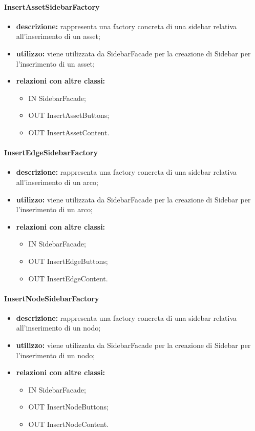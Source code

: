 \paragraph{InsertAssetSidebarFactory}
\begin{itemize}
	\item \textbf{descrizione:} rappresenta una factory concreta di una sidebar relativa all'inserimento di un asset;
	\item \textbf{utilizzo:} viene utilizzata da SidebarFacade per la creazione di Sidebar per l'inserimento di un asset;
	\item \textbf{relazioni con altre classi:} 
	\begin{itemize}
		\item IN SidebarFacade;
		\item OUT InsertAssetButtons;
		\item OUT InsertAssetContent.
	\end{itemize}
\end{itemize}
\paragraph{InsertEdgeSidebarFactory}
\begin{itemize}
	\item \textbf{descrizione:} rappresenta una factory concreta di una sidebar relativa all'inserimento di un arco;
	\item \textbf{utilizzo:} viene utilizzata da SidebarFacade per la creazione di Sidebar per l'inserimento di un arco;
	\item \textbf{relazioni con altre classi:} 
	\begin{itemize}
		\item IN SidebarFacade;
		\item OUT InsertEdgeButtons;
		\item OUT InsertEdgeContent.
	\end{itemize}
\end{itemize}
\paragraph{InsertNodeSidebarFactory}
\begin{itemize}
	\item \textbf{descrizione:} rappresenta una factory concreta di una sidebar relativa all'inserimento di un nodo;
	\item \textbf{utilizzo:} viene utilizzata da SidebarFacade per la creazione di Sidebar per l'inserimento di un nodo;
	\item \textbf{relazioni con altre classi:} 
	\begin{itemize}
		\item IN SidebarFacade;
		\item OUT InsertNodeButtons;
		\item OUT InsertNodeContent.
	\end{itemize}
\end{itemize}
